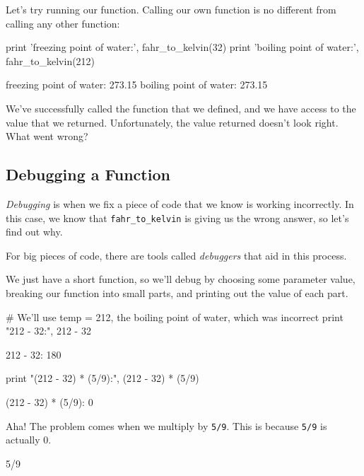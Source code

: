 Let's try running our function. Calling our own function is no different
from calling any other function:

\begin{VerbIn}
print 'freezing point of water:', fahr_to_kelvin(32)
print 'boiling point of water:', fahr_to_kelvin(212)
\end{VerbIn}

\begin{VerbOut}
freezing point of water: 273.15
boiling point of water: 273.15
\end{VerbOut}

We've successfully called the function that we defined, and we have
access to the value that we returned. Unfortunately, the value returned
doesn't look right. What went wrong?

\subsection{Debugging a Function}

\emph{Debugging} is when we fix a piece of code that we know is working
incorrectly. In this case, we know that \texttt{fahr\_to\_kelvin} is
giving us the wrong answer, so let's find out why.

For big pieces of code, there are tools called \emph{debuggers} that aid
in this process.

We just have a short function, so we'll debug by choosing some parameter
value, breaking our function into small parts, and printing out the
value of each part.

\begin{VerbIn}
# We'll use temp = 212, the boiling point of water, which was incorrect
print "212 - 32:", 212 - 32
\end{VerbIn}

\begin{VerbOut}
212 - 32: 180
\end{VerbOut}

\begin{VerbIn}
print "(212 - 32) * (5/9):", (212 - 32) * (5/9)
\end{VerbIn}

\begin{VerbOut}
(212 - 32) * (5/9): 0
\end{VerbOut}

Aha! The problem comes when we multiply by \texttt{5/9}. This is because
\texttt{5/9} is actually 0.

\begin{VerbIn}
5/9
\end{VerbIn}

